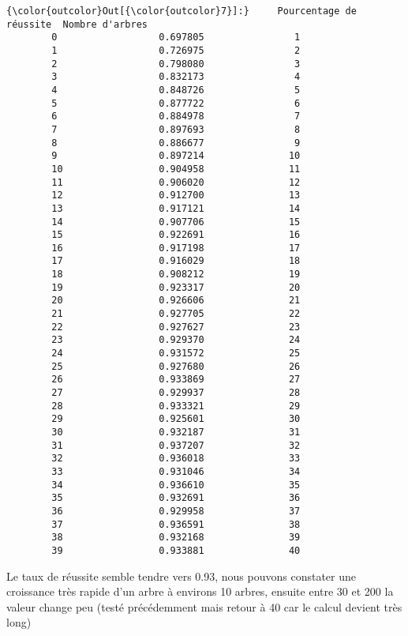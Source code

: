 \documentclass[11pt]{article}
\begin{document}
\begin{Verbatim}[commandchars=\\\{\}]
{\color{outcolor}Out[{\color{outcolor}7}]:}     Pourcentage de réussite  Nombre d'arbres
        0                  0.697805                1
        1                  0.726975                2
        2                  0.798080                3
        3                  0.832173                4
        4                  0.848726                5
        5                  0.877722                6
        6                  0.884978                7
        7                  0.897693                8
        8                  0.886677                9
        9                  0.897214               10
        10                 0.904958               11
        11                 0.906020               12
        12                 0.912700               13
        13                 0.917121               14
        14                 0.907706               15
        15                 0.922691               16
        16                 0.917198               17
        17                 0.916029               18
        18                 0.908212               19
        19                 0.923317               20
        20                 0.926606               21
        21                 0.927705               22
        22                 0.927627               23
        23                 0.929370               24
        24                 0.931572               25
        25                 0.927680               26
        26                 0.933869               27
        27                 0.929937               28
        28                 0.933321               29
        29                 0.925601               30
        30                 0.932187               31
        31                 0.937207               32
        32                 0.936018               33
        33                 0.931046               34
        34                 0.936610               35
        35                 0.932691               36
        36                 0.929958               37
        37                 0.936591               38
        38                 0.932168               39
        39                 0.933881               40
\end{Verbatim}
            
    Le taux de réussite semble tendre vers 0.93, nous pouvons constater une
croissance très rapide d'un arbre à environs 10 arbres, ensuite entre 30
et 200 la valeur change peu (testé précédemment mais retour à 40 car le
calcul devient très long)
\end{document}
